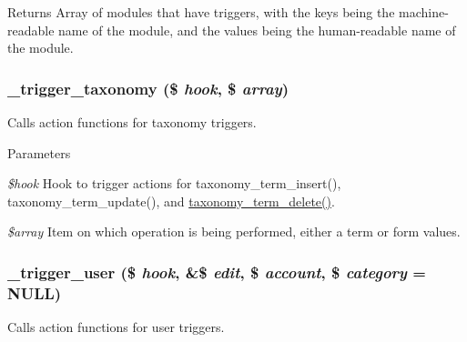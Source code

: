 \begin{DoxyReturn}{Returns}
Array of modules that have triggers, with the keys being the machine-\/readable name of the module, and the values being the human-\/readable name of the module. 
\end{DoxyReturn}
\hypertarget{trigger_8module_a359aa09b818c6ca9e9b14f57525955c1}{
\subsubsection[{\_\-trigger\_\-taxonomy}]{\setlength{\rightskip}{0pt plus 5cm}\_\-trigger\_\-taxonomy (\$ {\em hook}, \/  \$ {\em array})}}
\label{trigger_8module_a359aa09b818c6ca9e9b14f57525955c1}
Calls action functions for taxonomy triggers.


\begin{DoxyParams}{Parameters}
\item[{\em \$hook}]Hook to trigger actions for taxonomy\_\-term\_\-insert(), taxonomy\_\-term\_\-update(), and \hyperlink{taxonomy_8module_a4439428fa6a739b263aeef517a9f8876}{taxonomy\_\-term\_\-delete()}. \item[{\em \$array}]Item on which operation is being performed, either a term or form values. \end{DoxyParams}
\hypertarget{trigger_8module_ac2a775158a19f82796e05b0ecb9736bd}{
\subsubsection[{\_\-trigger\_\-user}]{\setlength{\rightskip}{0pt plus 5cm}\_\-trigger\_\-user (\$ {\em hook}, \/  \&\$ {\em edit}, \/  \$ {\em account}, \/  \$ {\em category} = {\ttfamily NULL})}}
\label{trigger_8module_ac2a775158a19f82796e05b0ecb9736bd}
Calls action functions for user triggers.


